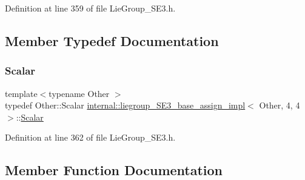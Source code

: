 Definition at line 359 of file Lie\+Group\+\_\+\+S\+E3.\+h.



\subsection{Member Typedef Documentation}
\hypertarget{structinternal_1_1liegroup___s_e3__base__assign__impl_3_01_other_00_014_00_014_01_4_a850deb96b6b52d92a8ae1e6d771b24be}{}\label{structinternal_1_1liegroup___s_e3__base__assign__impl_3_01_other_00_014_00_014_01_4_a850deb96b6b52d92a8ae1e6d771b24be} 
\subsubsection{\texorpdfstring{Scalar}{Scalar}}
{\footnotesize\ttfamily template$<$typename Other $>$ \\
typedef Other\+::\+Scalar \hyperlink{structinternal_1_1liegroup___s_e3__base__assign__impl}{internal\+::liegroup\+\_\+\+S\+E3\+\_\+base\+\_\+assign\+\_\+impl}$<$ Other, 4, 4 $>$\+::\hyperlink{structinternal_1_1liegroup___s_e3__base__assign__impl_3_01_other_00_014_00_014_01_4_a850deb96b6b52d92a8ae1e6d771b24be}{Scalar}}



Definition at line 362 of file Lie\+Group\+\_\+\+S\+E3.\+h.



\subsection{Member Function Documentation}
\hypertarget{structinternal_1_1liegroup___s_e3__base__assign__impl_3_01_other_00_014_00_014_01_4_a23f778b47ec9a8303bcb3ee52cc84c0f}{}\label{structinternal_1_1liegroup___s_e3__base__assign__impl_3_01_other_00_014_00_014_01_4_a23f778b47ec9a8303bcb3ee52cc84c0f} 
